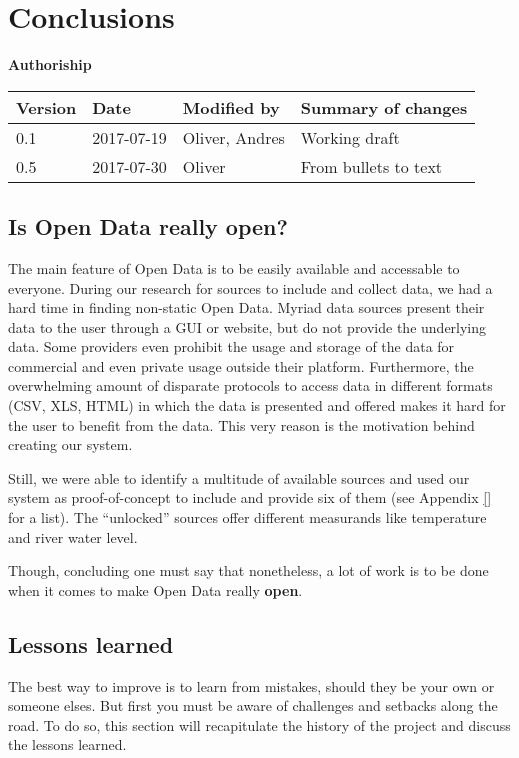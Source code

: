 \section{Conclusions}\label{sec:conclusions}

\textbf{Authoriship}

\begin{longtable}{@{}llll@{}}
\toprule
Version & Date & Modified by & Summary of changes\tabularnewline
\midrule
\endhead
0.1 & 2017-07-19 & Oliver, Andres & Working draft\tabularnewline
0.5 & 2017-07-30 & Oliver & From bullets to text\tabularnewline
\bottomrule
\end{longtable}

\subsection{Is Open Data really open?}\label{is-open-data-really-open}

The main feature of Open Data is to be easily available and accessable to everyone. During our research for sources to include and collect data, we had a hard time in finding non-static Open Data. Myriad data sources present their data to the user through a GUI or website, but do not provide the underlying data. Some providers even prohibit the usage and storage of the data for commercial and even private usage outside their platform. Furthermore, the overwhelming amount of disparate protocols to access data in different formats (CSV, XLS, HTML) in which the data is presented and offered makes it hard for the user to benefit from the data. This very reason is the motivation behind creating our system.

Still, we were able to identify a multitude of available sources and used our system as proof-of-concept to include and provide six of them (see Appendix \ref{} for a list). The "`unlocked"' sources offer different measurands like temperature and river water level.

Though, concluding one must say that nonetheless, a lot of work is to be done when it comes to make Open Data really \textbf{open}.

\subsection{Lessons learned}\label{lessons-learned}

The best way to improve is to learn from mistakes, should they be your own or someone elses. But first you must be aware of challenges and setbacks along the road. To do so, this section will recapitulate the history of the project and discuss the lessons learned.


